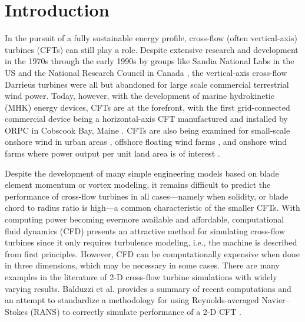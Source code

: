 \documentclass[aip,graphicx]{revtex4-1}
\begin{document}
\pacs{}%

\maketitle %
\listoftodos

\section{Introduction}

In the pursuit of a fully sustainable energy profile, cross-flow (often
vertical-axis) turbines (CFTs) can still play a role. Despite extensive research
and development in the 1970s through the early 1990s by groups like Sandia
National Labs in the US \cite{Sutherland2012} and the National Research Council
in Canada \cite{Para2002}, the vertical-axis cross-flow Darrieus turbines were
all but abandoned for large scale commercial terrestrial wind power. Today,
however, with the development of marine hydrokinetic (MHK) energy devices, CFTs
are at the forefront, with the first grid-connected commercial device being a
horizontal-axis CFT manufactured and installed by ORPC in Cobscook Bay, Maine
\cite{ORPC2012}. CFTs are also being examined for small-scale onshore wind in
urban areas \cite{Lott2015}, offshore floating wind farms \cite{Paulsen2011,
    Sandia2012}, and onshore wind farms where power output per unit land area is of
interest \cite{Dabiri2011}.

Despite the development of many simple engineering models based on blade element
momentum or vortex modeling, it remains difficult to predict the performance of
cross-flow turbines in all cases---namely when solidity, or blade chord to
radius ratio is high---a common characteristic of the smaller CFTs. With
computing power becoming evermore available and affordable, computational fluid
dynamics (CFD) presents an attractive method for simulating cross-flow turbines
since it only requires turbulence modeling, i.e., the machine is described from
first principles. However, CFD can be computationally expensive when done in
three dimensions, which may be necessary in some cases. There are many examples
in the literature of 2-D cross-flow turbine simulations with widely varying
results. Balduzzi et al. provides a summary of recent computations and an
attempt to standardize a methodology for using Reynolds-averaged Navier--Stokes
(RANS) to correctly simulate performance of a 2-D CFT \cite{Balduzzi2016}.
\end{document}
